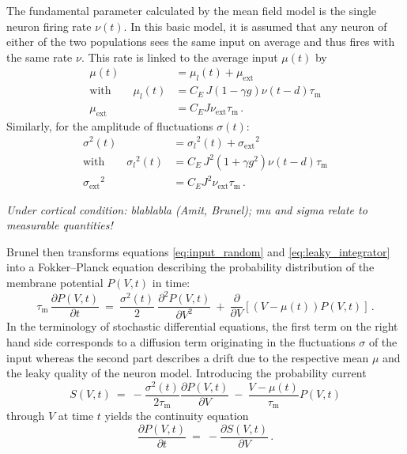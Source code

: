The fundamental parameter calculated by the mean field model is the single neuron
firing rate $\nu(t)$. In this basic model, it is assumed that any neuron of either 
of the two populations sees the same input on average and thus fires with the same 
rate $\nu$. This rate is linked to the average input $\mu(t)$ by
\begin{equation}
    \begin{split}
        \mu(t)          &= \mu_l(t) + \mu_\text{ext} \\
        \text{with} \qquad \mu_l(t)        &= C_E \, J (1 - \gamma g) \nu(t - d) \tau_\text{m} \\
        \mu_\text{ext}  &= C_E J \nu_\text{ext} \tau_\text{m} \,.
        \label{eq:mu}
    \end{split}
\end{equation}
Similarly, for the amplitude of fluctuations $\sigma(t)$:
\begin{equation}
    \begin{split}
        \sigma^2(t)     &= {\sigma_l}^2(t) + {\sigma_\text{ext}}^2 \\
        \text{with} \qquad {\sigma_l}^2(t)       
                        &= C_E \, J^2 (1 + \gamma g^2) \nu(t - d) \tau_\text{m} \\
        {\sigma_\text{ext}}^2  &= C_E J^2 \nu_\text{ext} \tau_\text{m} \,.
        \label{eq:sigma}
    \end{split}
\end{equation}

\emph{Under cortical condition: blablabla (Amit, Brunel); 
mu and sigma relate to measurable quantities!}


Brunel then transforms equations \eqref{eq:input_random} and \eqref{eq:leaky_integrator}
into a Fokker--Planck equation describing the probability distribution of the membrane 
potential $P(V, t)$ in time: 
\begin{equation}
    \tau_\text{m} \, \frac{\partial P(V, t)}{\partial t} 
       \: = \: \frac{\sigma^2(t)}{2}  \: \frac{\partial^2 P(V, t)}{\partial V^2} 
         \: + \: \frac{\partial }{\partial V}  [(V- \mu(t)) P(V, t)] \, .
    \label{eq:fokker_planck}
\end{equation}
In the terminology of stochastic differential equations, the first term on the 
right hand side corresponds to a diffusion term originating in the fluctuations $\sigma$ 
of the input whereas the second part describes a drift due to the respective mean $\mu$ 
and the leaky quality of the neuron model. Introducing the probability current 
\begin{equation}
    S(V, t) 
    \: = \: - \frac{\sigma^2(t)}{2 \tau_\text{m}} \frac{\partial P(V, t)}{\partial V}  
        \: - \: \frac{V - \mu(t)}{\tau_\text{m}} P(V, t)
    \label{eq:prob_curr}
\end{equation}
through $V$ at time $t$ yields the continuity equation 
\begin{equation}
    \frac{\partial P(V, t)}{\partial t} \:=\: - \frac{\partial S(V, t)}{\partial V} \,.
    \label{eq:continuity}
\end{equation}

